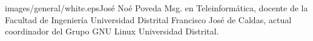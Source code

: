 \begin{multicols}{2}


\begin{biografia}{images/general/white.eps}{José Noé Poveda} 
Msg. en Teleinformática, docente de la Facultad de Ingeniería Universidad Distrital Francisco José de Caldas, actual coordinador del Grupo GNU Linux Universidad Distrital.
\end{biografia}

\raggedcolumns
\pagebreak

\end{multicols}

\clearpage
\pagebreak